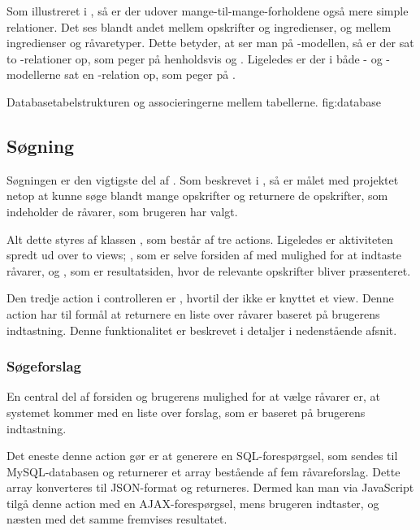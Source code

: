 Som illustreret i , så er der udover mange-til-mange-forholdene også mere simple relationer. Det ses blandt andet mellem opskrifter og ingredienser, og mellem ingredienser og råvaretyper. Dette betyder, at ser man på -modellen, så er der sat to -relationer op, som peger på henholdsvis  og . Ligeledes er der i både - og -modellerne sat en -relation op, som peger på .

  {Databasetabelstrukturen og associeringerne mellem tabellerne.}
  {fig:database}

\subsection{Søgning}
\label{sec:funktionalitet-soegning}
Søgningen er den vigtigste del af \Foodl{}. Som beskrevet i , så er målet med projektet netop at kunne søge blandt mange opskrifter og returnere de opskrifter, som indeholder de råvarer, som brugeren har valgt.

Alt dette styres af klassen , som består af tre actions. Ligeledes er aktiviteten spredt ud over to views; , som er selve forsiden af \Foodl{} med mulighed for at indtaste råvarer, og , som er resultatsiden, hvor de relevante opskrifter bliver præsenteret.

Den tredje action i controlleren er , hvortil der ikke er knyttet et view. Denne action har til formål at returnere en liste over råvarer baseret på brugerens indtastning. Denne funktionalitet er beskrevet i detaljer i nedenstående afsnit.

\subsubsection{Søgeforslag}
En central del af forsiden og brugerens mulighed for at vælge råvarer er, at systemet kommer med en liste over forslag, som er baseret på brugerens indtastning.

Det eneste denne action gør er at generere en SQL-forespørgsel, som sendes til MySQL-databasen og returnerer et array bestående af fem råvareforslag. Dette array konverteres til JSON-format og returneres. Dermed kan man via JavaScript tilgå denne action med en AJAX-forespørgsel, mens brugeren indtaster, og næsten med det samme fremvises resultatet.

